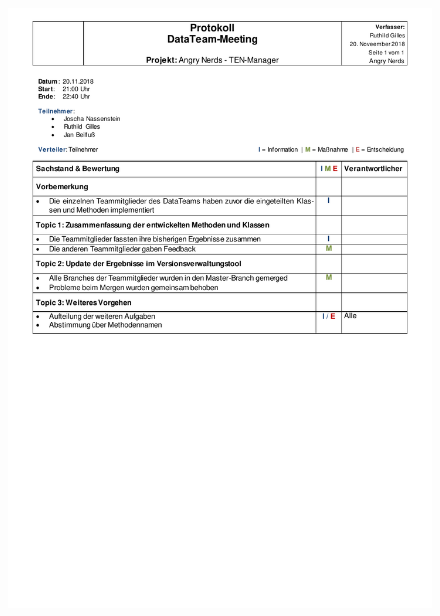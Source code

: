 \begin{figure}[H]
\centering
\begin{minipage}[t]{1\textwidth} %
\includegraphics[width=1\textwidth]{img/Protokoll-DataTeam2018-11-20.pdf}\\ %
\end{minipage}
\end{figure}


